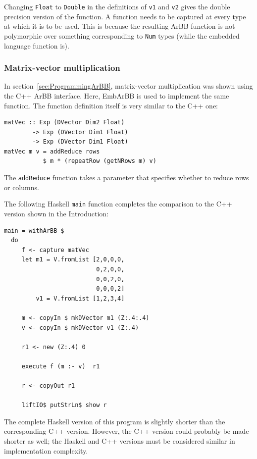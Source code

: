 

Changing {\tt Float} to {\tt Double} in the definitions 
of {\tt v1} and {\tt v2} gives the double precision version of the function.
A function needs to be captured at every type at which it is to be used. This 
is because the resulting ArBB function is not polymorphic over something corresponding 
to {\tt Num} types (while the embedded language function is). 

\subsubsection{Matrix-vector multiplication} 
In section~\ref{sec:ProgrammingArBB}, matrix-vector multiplication was shown using the C++ ArBB interface. 
Here, EmbArBB is used to implement the same function. The function definition itself 
is very similar to the C++ one:

\begin{verbatim} 
matVec :: Exp (DVector Dim2 Float) 
        -> Exp (DVector Dim1 Float) 
        -> Exp (DVector Dim1 Float) 
matVec m v = addReduce rows 
           $ m * (repeatRow (getNRows m) v)

\end{verbatim} 

The {\tt addReduce} function takes a parameter that specifies whether to reduce 
rows or columns. 


The following Haskell {\tt main} function completes the comparison to the C++ version shown in the Introduction:

\begin{Verbatim}[samepage=true]
main = withArBB $ 
  do 
     f <- capture matVec  
     let m1 = V.fromList [2,0,0,0,
                          0,2,0,0,
                          0,0,2,0,
                          0,0,0,2]
         v1 = V.fromList [1,2,3,4] 
     
     m <- copyIn $ mkDVector m1 (Z:.4:.4) 
     v <- copyIn $ mkDVector v1 (Z:.4) 

     r1 <- new (Z:.4) 0 

     execute f (m :- v)  r1
              
     r <- copyOut r1
              
     liftIO$ putStrLn$ show r
\end{Verbatim}
The complete Haskell version of this program is slightly shorter than the corresponding 
C++ version. However, the C++ version could probably be made shorter as well; the Haskell and C++ versions must be considered similar in implementation complexity. 

